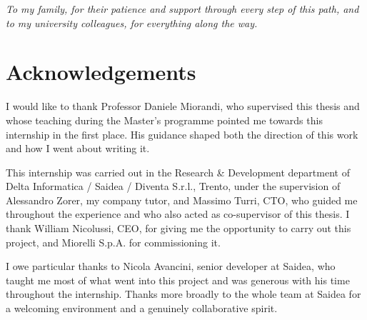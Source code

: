 

\LogoWidth{4.5cm} %

\begin{titlepage}
    \pagestyle{empty}
    \makefrontpage
    \restoregeometry
\end{titlepage}


\newpage
\thispagestyle{empty}
\mbox{}  %
\newpage


\frontmatter
\null{}
\begin{flushright}
    \textit{To my family, for their patience and support through every step of this path, and to my university colleagues, for everything along the way.}
\end{flushright}
\null

\chapter*{Acknowledgements}

I would like to thank Professor Daniele Miorandi, who supervised this thesis and whose teaching during the Master's programme pointed me towards this internship in the first place. His guidance shaped both the direction of this work and how I went about writing it.

This internship was carried out in the Research \& Development department of Delta Informatica / Saidea / Diventa S.r.l., Trento, under the supervision of Alessandro Zorer, my company tutor, and Massimo Turri, CTO, who guided me throughout the experience and who also acted as co-supervisor of this thesis. I thank William Nicolussi, CEO, for giving me the opportunity to carry out this project, and Miorelli S.p.A. for commissioning it.

I owe particular thanks to Nicola Avancini, senior developer at Saidea, who taught me most of what went into this project and was generous with his time throughout the internship. Thanks more broadly to the whole team at Saidea for a welcoming environment and a genuinely collaborative spirit.


